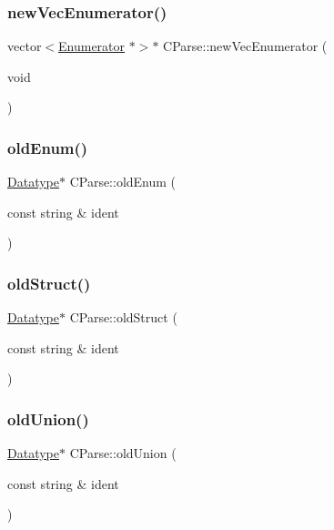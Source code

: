 \subsubsection{\texorpdfstring{newVecEnumerator()}{newVecEnumerator()}}
{\footnotesize\ttfamily vector$<$\mbox{\hyperlink{struct_enumerator}{Enumerator}} $\ast$$>$$\ast$ C\+Parse\+::new\+Vec\+Enumerator (\begin{DoxyParamCaption}\item[{void}]{ }\end{DoxyParamCaption})}

\mbox{\label{class_c_parse_a1bc333d7eb8f7976f5f510e30f234c5f}} 
\subsubsection{\texorpdfstring{oldEnum()}{oldEnum()}}
{\footnotesize\ttfamily \mbox{\hyperlink{class_datatype}{Datatype}}$\ast$ C\+Parse\+::old\+Enum (\begin{DoxyParamCaption}\item[{const string \&}]{ident }\end{DoxyParamCaption})}

\mbox{\label{class_c_parse_a3f3a9630b4dcbc3549a437604493986e}} 
\subsubsection{\texorpdfstring{oldStruct()}{oldStruct()}}
{\footnotesize\ttfamily \mbox{\hyperlink{class_datatype}{Datatype}}$\ast$ C\+Parse\+::old\+Struct (\begin{DoxyParamCaption}\item[{const string \&}]{ident }\end{DoxyParamCaption})}

\mbox{\label{class_c_parse_a499bd3b597a080a70422346c717161d5}} 
\subsubsection{\texorpdfstring{oldUnion()}{oldUnion()}}
{\footnotesize\ttfamily \mbox{\hyperlink{class_datatype}{Datatype}}$\ast$ C\+Parse\+::old\+Union (\begin{DoxyParamCaption}\item[{const string \&}]{ident }\end{DoxyParamCaption})}

